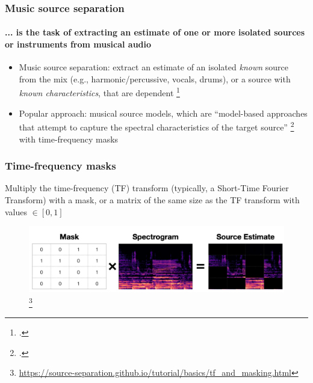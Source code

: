 \documentclass[usenames,dvipsnames]{beamer}
\begin{document}
\begin{frame}
	\frametitle{Music source separation}
	\framesubtitle{... is the task of extracting an estimate of one or more isolated sources or instruments from musical audio}
	\begin{itemize}
	       \item
		       Music source separation: extract an estimate of an isolated \textit{known} source from the mix (e.g., harmonic/percussive, vocals, drums), or a source with \textit{known characteristics}, that are dependent \footcite{musicsepintro1}
	       \item
			Popular approach: musical source models, which are ``model-based approaches that attempt to capture the spectral characteristics of the target source'' \footcite[36]{musicsepgood} with time-frequency masks
	\end{itemize}
	\begin{figure}
		\centering
		\vspace{-1.25em}
	\end{figure}
\end{frame}

\begin{frame}
	\frametitle{Time-frequency masks}
	Multiply the time-frequency (TF) transform (typically, a Short-Time Fourier Transform) with a mask, or a matrix of the same size as the TF transform with values $\in [0, 1]$
	\begin{figure}
		\centering
		\includegraphics[width=12cm]{./images-mss/mask_simple.png}\footnote{\url{https://source-separation.github.io/tutorial/basics/tf_and_masking.html}}
	\end{figure}
\end{frame}
\end{document}
